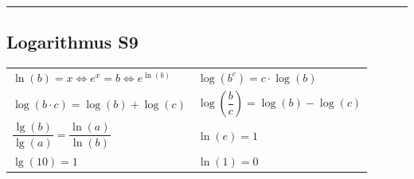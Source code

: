 	\vspace{1mm}	
	\hrule
	
		
%		
%
\begin{minipage}[t]{0.49\columnwidth}
	\vspace{1mm}
	\subsection{Logarithmus {\color{red} S9}}
	\begin{tabular}{ll}
		$\ln(b)=x\Leftrightarrow e^{x}=b\Leftrightarrow e^{\ln(b)}$ & $\log(b^{c})=c \cdot\log(b)$\\[2mm]
		$\log(b \cdot c)=\log(b)+\log(c)$ & $\log\left(\dfrac{b}{c}\right)=\log(b)-\log(c)$\\[2mm]
		$\dfrac{\lg(b)}{\lg(a)}=\dfrac{\ln(a)}{\ln(b)}$ & $\ln(e)=1$ \\[4mm]
		$\lg(10)=1$ & $\ln(1)=0$\\
	\end{tabular}
	\vspace{1mm}
\end{minipage} \vline \hspace{0.02\columnwidth} 
